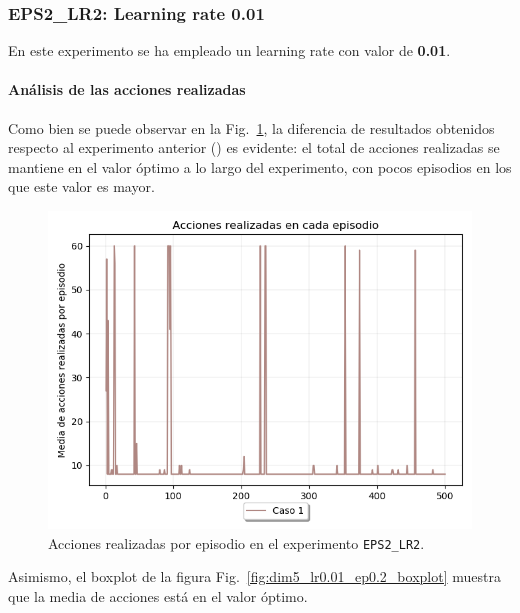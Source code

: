 \subsubsection{EPS2\_LR2: Learning rate 0.01} \label{EPS2_LR2}

En este experimento se ha empleado un learning rate con valor de \textbf{0.01}. 

\paragraph{Análisis de las acciones realizadas}

Como bien se puede observar en la Fig.~\ref{fig:dim5_lr0.01_ep0.2_acciones}, la diferencia de resultados obtenidos respecto al experimento anterior () es evidente: el total de acciones realizadas se mantiene en el valor óptimo a lo largo del experimento, con pocos episodios en los que este valor es mayor. \\

\begin{figure}
    \centering
    \includegraphics[scale=0.4]{cap5_experimentacion/images/dim5_lr0.01_ep0.2_acciones.png}
        \caption{Acciones realizadas por episodio en el experimento \texttt{EPS2\_LR2}.}
    \label{fig:dim5_lr0.01_ep0.2_acciones}
\end{figure}

Asimismo, el boxplot de la figura Fig.~\ref{fig:dim5_lr0.01_ep0.2_boxplot} muestra que la media de acciones está en el valor óptimo. \\

